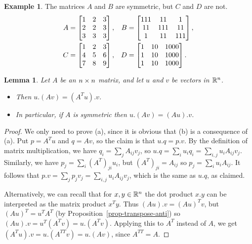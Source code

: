 \documentclass[reqno]{amsart}
\newtheorem{lemma}[theorem]{Lemma}
\theoremstyle{definition}
\newtheorem{example}[theorem]{Example}
\begin{document}
\begin{example}
 The matrices $A$ and $B$ are symmetric, but $C$ and $D$ are not.
 \begin{align*}
    A &
     = \left[\begin{matrix} 1 & 2 & 3 \\ 2 & 2 & 3 \\ 3 & 3 & 3 \end{matrix}\right], &
    B &
     = \left[\begin{matrix} 111 & 11 & 1 \\ 11 & 111 & 11 \\ 1 & 11 & 111 \end{matrix}\right],\\
    C &
     = \left[\begin{matrix} 1 & 2 & 3 \\ 4 & 5 & 6 \\ 7 & 8 & 9 \end{matrix}\right], &
    D &
     = \left[\begin{matrix} 1 & 10 & 1000 \\ 1 & 10 & 1000 \\ 1 & 10 & 1000 \end{matrix}\right].
 \end{align*}
\end{example}

\begin{lemma}\label{lem-transpose-adjoint}
 Let $A$ be an $n\times n$ matrix, and let $u$ and $v$ be vectors in
 ${\mathbb{R}}^n$.
 \begin{itemize}
 \item[(a)] Then $u.(Av)=(A^Tu).v$.
 \item[(b)] In particular, if $A$ is symmetric
 then $u.(Av)=(Au).v$.
 \end{itemize}
\end{lemma}
\begin{proof}
 We only need to prove (a), since it is obvious that (b) is a
 consequence of (a).
 Put $p=A^Tu$ and $q=Av$, so the claim is that $u.q=p.v$.  By
 the definition of matrix multiplication, we have
 $q_i=\sum_jA_{ij}v_j$, so $u.q=\sum_iu_iq_i=\sum_{i,j}u_iA_{ij}v_j$.
 Similarly, we have $p_j=\sum_i(A^T)_{ji}u_i$, but $(A^T)_{ji}=A_{ij}$
 so $p_j=\sum_iu_iA_{ij}$.  It follows that
 $p.v=\sum_jp_jv_j=\sum_{i,j}u_iA_{ij}v_j$, which is the same as
 $u.q$, as claimed.

 Alternatively, we can recall that for $x,y\in{\mathbb{R}}^n$ the dot product
 $x.y$ can be interpreted as the matrix product $x^Ty$.  Thus
 $(Au).v=(Au)^Tv$, but $(Au)^T=u^TA^T$ (by
 Proposition~\ref{prop-transpose-anti}) so
 $(Au).v=u^T(A^Tv)=u.(A^Tv)$.
 Applying this to $A^T$ instead of $A$, we get
 $(A^T u).v = u.(A^{TT} v) = u.(Av)$, since $A^{TT} = A$.
\end{proof}
\end{document}
